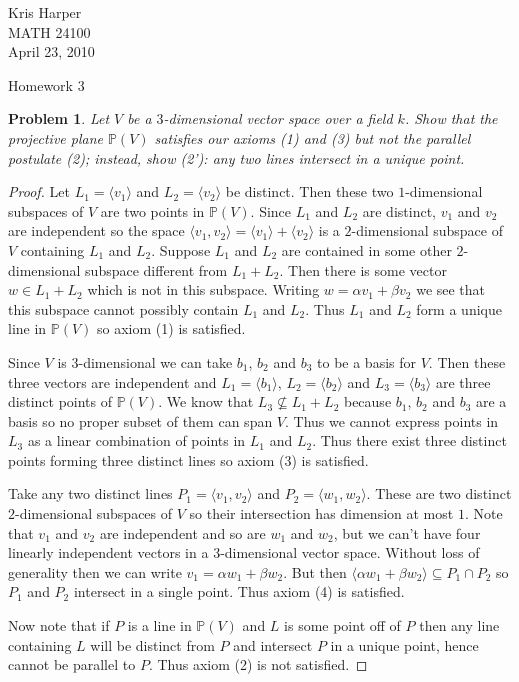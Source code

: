 \documentclass{article}
\newtheorem{problem}{Problem}
\begin{document}
\begin{flushright}
Kris Harper\\

MATH 24100\\

April 23, 2010
\end{flushright}

\begin{center}
Homework 3
\end{center}

\begin{problem}
Let $V$ be a $3$-dimensional vector space over a field $k$. Show that the projective plane $\mathbb{P}(V)$ satisfies our axioms (1) and (3) but not the parallel postulate (2); instead, show (2'): any two lines intersect in a unique point.
\end{problem}
\begin{proof}
Let $L_1 = \langle v_1 \rangle$ and $L_2 = \langle v_2 \rangle$ be distinct. Then these two $1$-dimensional subspaces of $V$ are two points in $\mathbb{P}(V)$. Since $L_1$ and $L_2$ are distinct, $v_1$ and $v_2$ are independent so the space $\langle v_1, v_2 \rangle = \langle v_1 \rangle + \langle v_2 \rangle$ is a $2$-dimensional subspace of $V$ containing $L_1$ and $L_2$. Suppose $L_1$ and $L_2$ are contained in some other $2$-dimensional subspace different from $L_1 + L_2$. Then there is some vector $w \in L_1 + L_2$ which is not in this subspace. Writing $w = \alpha v_1 + \beta v_2$ we see that this subspace cannot possibly contain $L_1$ and $L_2$. Thus $L_1$ and $L_2$ form a unique line in $\mathbb{P}(V)$ so axiom (1) is satisfied.

Since $V$ is $3$-dimensional we can take $b_1$, $b_2$ and $b_3$ to be a basis for $V$. Then these three vectors are independent and $L_1 = \langle b_1 \rangle$, $L_2 = \langle b_2 \rangle$ and $L_3 = \langle b_3 \rangle$ are three distinct points of $\mathbb{P}(V)$. We know that $L_3 \nsubseteq L_1 + L_2$ because $b_1$, $b_2$ and $b_3$ are a basis so no proper subset of them can span $V$. Thus we cannot express points in $L_3$ as a linear combination of points in $L_1$ and $L_2$. Thus there exist three distinct points forming three distinct lines so axiom (3) is satisfied.

Take any two distinct lines $P_1 = \langle v_1, v_2 \rangle$ and $P_2 = \langle w_1, w_2 \rangle$. These are two distinct $2$-dimensional subspaces of $V$ so their intersection has dimension at most $1$. Note that $v_1$ and $v_2$ are independent and so are $w_1$ and $w_2$, but we can't have four linearly independent vectors in a $3$-dimensional vector space. Without loss of generality then we can write $v_1 = \alpha w_1 + \beta w_2$. But then $\langle \alpha w_1 + \beta w_2 \rangle \subseteq P_1 \cap P_2$ so $P_1$ and $P_2$ intersect in a single point. Thus axiom (4) is satisfied.

Now note that if $P$ is a line in $\mathbb{P}(V)$ and $L$ is some point off of $P$ then any line containing $L$ will be distinct from $P$ and intersect $P$ in a unique point, hence cannot be parallel to $P$. Thus axiom (2) is not satisfied.
\end{proof}
\end{document}
